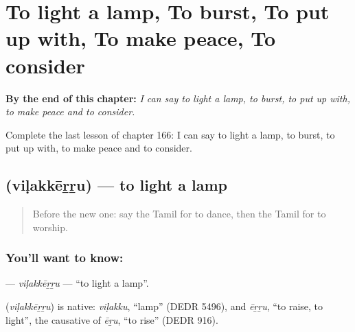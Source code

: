 
\chapter{To light a lamp, To burst, To put up with, To make peace, To consider}
\label{ch:ta-to-light-a-lamp-to-burst-to-put-up-with-to-make-peace-to-consider}

\begin{chapteropening}
\textbf{By the end of this chapter:} \emph{I can say to light a lamp, to burst, to put up with, to make peace and to consider.}

Complete the last lesson of chapter 166: I can say to light a lamp, to burst, to put up with, to make peace and to consider.
\end{chapteropening}

\section[\texorpdfstring{\ta{விளக்கேற்று} (viḷakkēṟṟu)}{விளக்கேற்று (viḷakkēṟṟu)}]{ (viḷakkēṟṟu) — to light a lamp}

\label{lesson:TA-C166-vilakkerru}



\begin{quote}
Before the new one: say the Tamil for to dance, then the Tamil for to worship.
\end{quote}

\subsection*{You'll want to know: }
\textbf{} — \emph{viḷakkēṟṟu} — \textquotedblleft{}to light a lamp\textquotedblright{}.

\begin{cousinweb}
\textbf{} (\emph{viḷakkēṟṟu}) is native: \emph{viḷakku}, \textquotedblleft{}lamp\textquotedblright{} (DEDR 5496), and \emph{ēṟṟu}, \textquotedblleft{}to raise, to light\textquotedblright{}, the causative of \emph{ēṟu}, \textquotedblleft{}to rise\textquotedblright{} (DEDR 916).
\end{cousinweb}

